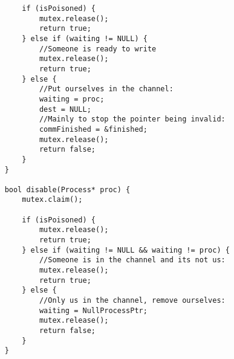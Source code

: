 \documentclass{article}
\begin{document}
{\begin{verbatim}
        if (isPoisoned) {
            mutex.release();
            return true;
        } else if (waiting != NULL) {
            //Someone is ready to write
            mutex.release();
            return true;
        } else {
            //Put ourselves in the channel:
            waiting = proc;
            dest = NULL;
            //Mainly to stop the pointer being invalid:
            commFinished = &finished;
            mutex.release();
            return false;
        }
    }

    bool disable(Process* proc) {
        mutex.claim();

        if (isPoisoned) {
            mutex.release();
            return true;
        } else if (waiting != NULL && waiting != proc) {
            //Someone is in the channel and its not us:
            mutex.release();
            return true;
        } else {
            //Only us in the channel, remove ourselves:
            waiting = NullProcessPtr;
            mutex.release();
            return false;
        }
    }
\end{verbatim}}
\end{document}
